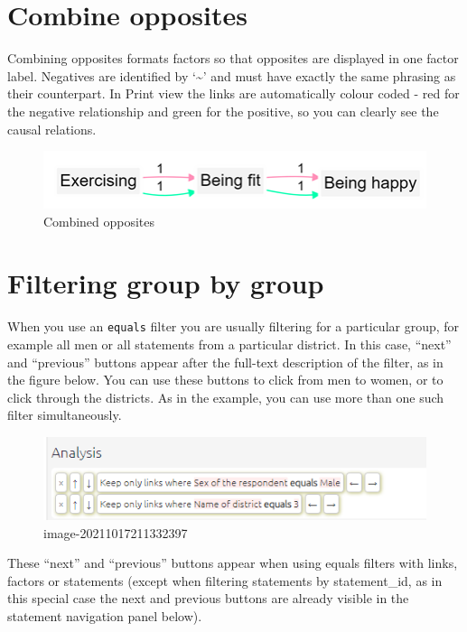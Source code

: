 \documentclass[
]{book}
\begin{document}
\hypertarget{combine-opposites}{%
\section{Combine opposites}\label{combine-opposites}}

Combining opposites formats factors so that opposites are displayed in one factor label. Negatives are identified by `\textasciitilde{}' and must have exactly the same phrasing as their counterpart. In Print view the links are automatically colour coded - red for the negative relationship and green for the positive, so you can clearly see the causal relations.

\begin{figure}
\centering
\includegraphics[width=6.77083in,height=\textheight]{_assets/Combined opposites.png}
\caption{Combined opposites}
\end{figure}

\hypertarget{filtering-group-by-group}{%
\section{Filtering group by group}\label{filtering-group-by-group}}

When you use an \texttt{equals} filter you are usually filtering for a particular group, for example all men or all statements from a particular district. In this case, ``next'' and ``previous'' buttons appear after the full-text description of the filter, as in the figure below. You can use these buttons to click from men to women, or to click through the districts. As in the example, you can use more than one such filter simultaneously.

\begin{figure}
\centering
\includegraphics{_assets/image-20211017211332397.png}
\caption{image-20211017211332397}
\end{figure}

These ``next'' and ``previous'' buttons appear when using equals filters with links, factors or statements (except when filtering statements by statement\_id, as in this special case the next and previous buttons are already visible in the statement navigation panel below).
\end{document}
